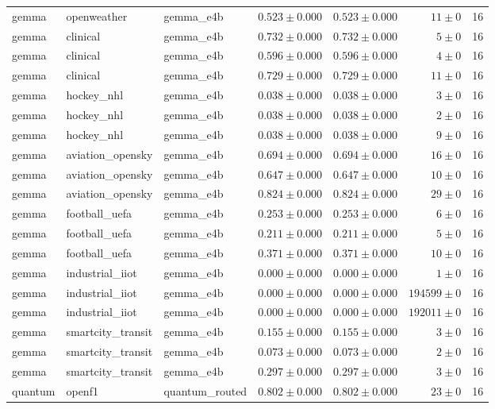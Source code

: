 \begin{table}[htbp]
\begin{tabular}{l l l r r r r}
gemma & openweather & gemma\_e4b & $0.523\pm0.000$ & $0.523\pm0.000$ & $11\pm0$ & 16 \\
gemma & clinical & gemma\_e4b & $0.732\pm0.000$ & $0.732\pm0.000$ & $5\pm0$ & 16 \\
gemma & clinical & gemma\_e4b & $0.596\pm0.000$ & $0.596\pm0.000$ & $4\pm0$ & 16 \\
gemma & clinical & gemma\_e4b & $0.729\pm0.000$ & $0.729\pm0.000$ & $11\pm0$ & 16 \\
gemma & hockey\_nhl & gemma\_e4b & $0.038\pm0.000$ & $0.038\pm0.000$ & $3\pm0$ & 16 \\
gemma & hockey\_nhl & gemma\_e4b & $0.038\pm0.000$ & $0.038\pm0.000$ & $2\pm0$ & 16 \\
gemma & hockey\_nhl & gemma\_e4b & $0.038\pm0.000$ & $0.038\pm0.000$ & $9\pm0$ & 16 \\
gemma & aviation\_opensky & gemma\_e4b & $0.694\pm0.000$ & $0.694\pm0.000$ & $16\pm0$ & 16 \\
gemma & aviation\_opensky & gemma\_e4b & $0.647\pm0.000$ & $0.647\pm0.000$ & $10\pm0$ & 16 \\
gemma & aviation\_opensky & gemma\_e4b & $0.824\pm0.000$ & $0.824\pm0.000$ & $29\pm0$ & 16 \\
gemma & football\_uefa & gemma\_e4b & $0.253\pm0.000$ & $0.253\pm0.000$ & $6\pm0$ & 16 \\
gemma & football\_uefa & gemma\_e4b & $0.211\pm0.000$ & $0.211\pm0.000$ & $5\pm0$ & 16 \\
gemma & football\_uefa & gemma\_e4b & $0.371\pm0.000$ & $0.371\pm0.000$ & $10\pm0$ & 16 \\
gemma & industrial\_iiot & gemma\_e4b & $0.000\pm0.000$ & $0.000\pm0.000$ & $1\pm0$ & 16 \\
gemma & industrial\_iiot & gemma\_e4b & $0.000\pm0.000$ & $0.000\pm0.000$ & $194599\pm0$ & 16 \\
gemma & industrial\_iiot & gemma\_e4b & $0.000\pm0.000$ & $0.000\pm0.000$ & $192011\pm0$ & 16 \\
gemma & smartcity\_transit & gemma\_e4b & $0.155\pm0.000$ & $0.155\pm0.000$ & $3\pm0$ & 16 \\
gemma & smartcity\_transit & gemma\_e4b & $0.073\pm0.000$ & $0.073\pm0.000$ & $2\pm0$ & 16 \\
gemma & smartcity\_transit & gemma\_e4b & $0.297\pm0.000$ & $0.297\pm0.000$ & $3\pm0$ & 16 \\
quantum & openf1 & quantum\_routed & $0.802\pm0.000$ & $0.802\pm0.000$ & $23\pm0$ & 16 \\

\end{tabular}
\end{table}

